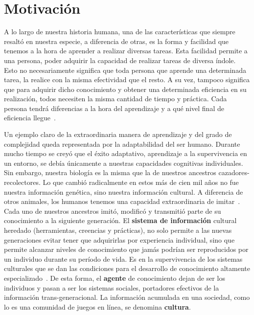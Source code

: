 \documentclass[11pt,twoside,spanish]{report} %
\begin{document}
%
%
%
\thispagestyle{plain}
\pagestyle{plain}





\section{Motivaci\'on}

A lo largo de nuestra historia humana, una de las caracter\'isticas que siempre resalt\'o en nuestra especie, a diferencia de otras, es la forma y facilidad que tenemos a la hora de aprender a realizar diversas tareas.
Esta facilidad permite a una persona, poder adquirir la capacidad de realizar tareas de diversa \'indole.
Esto no necesariamente significa que toda persona que aprende una determinada tarea, la realice con la misma efectividad que el resto.
A su vez, tampoco significa que para adquirir dicho conocimiento y obtener una determinada eficiencia en su realizaci\'on, todos necesiten la misma cantidad de tiempo y pr\'actica.
Cada persona tendr\'a diferencias a la hora del aprendizaje y a qu\'e nivel final de eficiencia llegue~\cite{Beheim2014,Derex2015,Gariepy2014,Glowacki2017}.

Un ejemplo claro de la extraordinaria manera de aprendizaje y del grado de complejidad queda representada por la adaptabilidad del ser humano.
Durante mucho tiempo se crey\'o que el \'exito adaptativo, aprendizaje a la supervivencia en un entorno, se deb\'ia \'unicamente a nuestras capacidades cognitivas individuales.
Sin embargo, nuestra biolog\'ia es la misma que la de nuestros ancestros cazadores-recolectores.
Lo que cambi\'o radicalmente en estos m\'as de cien mil a\~nos no fue nuestra informaci\'on gen\'etica, sino nuestra informaci\'on cultural.
A diferencia de otros animales, los humanos tenemos una capacidad extraordinaria de imitar~\cite{Richerson2010}.
Cada uno de nuestros ancestros imit\'o, modific\'o y transmiti\'o parte de su conocimiento a la siguiente generaci\'on.
El \textbf{sistema de informaci\'on} cultural heredado (herramientas, creencias y pr\'acticas), no solo permite a las nuevas generaciones evitar tener que adquirirlas por experiencia individual, sino que permite alcanzar niveles de conocimiento que jam\'as podr\'ian ser reproducidos por un individuo durante su per\'iodo de vida.
Es en la supervivencia de los sistemas culturales que se dan las condiciones para el desarrollo de conocimiento altamente especializado~\cite{Boyd2011}.
De esta forma, el \textbf{agente} de conocimiento dejan de ser los individuos y pasan a ser los sistemas sociales, portadores efectivos de la informaci\'on trans-generacional.
La informaci\'on acumulada en una sociedad, como lo es una comunidad de juegos en l\'inea, se denomina \textbf{cultura}.
\end{document}
